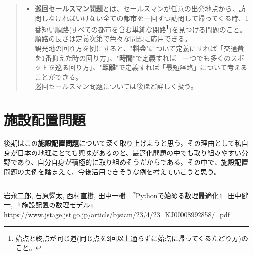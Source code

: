 \documentclass{jsarticle}
\begin{document}
\begin{quote}
 	\begin{itemize}
 		 \item {\bf 巡回セールスマン問題}とは、セールスマンが任意の出発地点から、訪問しなければいけない全ての都市を一回ずつ訪問して帰ってくる時、1番短い順路(すべての都市を含む単純な閉路\footnote{始点と終点が同じ道(同じ点を2回以上通らずに始点に帰ってくるたどり方)のこと。})を見つける問題のこと。順路の長さは定義次第で色々な問題に応用できる。\\観光地の回り方を例にすると、"{\bf 料金}"について定義にすれば「交通費を1番抑えた時の回り方」、"{\bf 時間}"で定義すれば「一つでも多くのスポットを巡る回り方」、"{\bf 距離}"で定義すれば「最短経路」について考えることができる。\\巡回セールスマン問題については後ほど詳しく扱う。
 	\end{itemize}
\end{quote}

\newpage

\section{施設配置問題}
後期はこの{\bf 施設配置問題}について深く取り上げようと思う。その理由として私自身が日本の地理にとても興味があるのと、最適化問題の中でも取り組みやすい分野であり、自分自身が積極的に取り組めそうだからである。その中で、施設配置問題の実例を踏まえて、今後活用できそうな例を考えていこうと思う。
\subsection{}






\newpage

\begin{thebibliography}{9}
	 岩永二郎, 石原響太, 西村直樹, 田中一樹　『Pythonで始める数理最適化』
	 田中健一, 『施設配置の数理モデル』 \url{https://www.jstage.jst.go.jp/article/bjsiam/23/4/23_KJ00008992858/_pdf}
	
\end{thebibliography}
\end{document}

